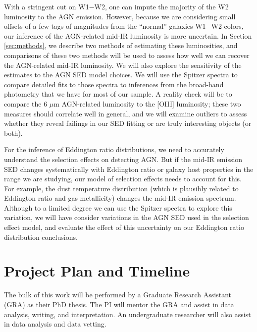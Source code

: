 \documentclass[12pt, preprint]{hacked-aastex}
\begin{document}
With a stringent cut on W1$-$W2, one can impute the majority of 
the W2 luminosity to the AGN emission. However, because we are
considering small offsets of a few tags of magnitudes from the 
``normal'' galaxies W1$-$W2 colors, our inference of the AGN-related
mid-IR luminosity is more uncertain. In Section \ref{sec:methods},
we describe two methods of estimating these luminosities, and comparisons
of these two methods will be used to assess how well we can recover
the AGN-related mid-IR luminosity. We will also explore the 
sensitivity of the estimates to the AGN SED model choices. 
We will use the Spitzer spectra to compare detailed fits to
those spectra to inferences from the broad-band photometry that we 
have for most of our sample. A reality check will be to compare
the 6 $\mu$m AGN-related luminosity to the [OIII] luminosity; these
two measures should correlate well in general, and we will 
examine outliers to assess whether they reveal failings in our
SED fitting or are truly interesting objects (or both).

For the inference of Eddington ratio distributions, we need to 
accurately understand the selection effects on detecting AGN. But 
if the mid-IR emission SED changes systematically with Eddington ratio
or galaxy host properties in the range we are studying, our model
of selection effects needs to account for this. For example, the
dust temperature distribution (which is plausibly related to Eddington 
ratio  and gas metallicity) changes the mid-IR emission spectrum.
Although to a limited degree we can use the Spitzer spectra to 
explore this variation, we will have consider variations in the
AGN SED used in the selection effect model, and evaluate the effect
of this uncertainty on our Eddington ratio distribution conclusions.


\section{Project Plan and Timeline\label{sec:plan}}

The bulk of this work will be performed by a Graduate Research
Assistant (GRA) as their PhD thesis.  The PI will mentor the GRA and 
assist in data analysis, writing, and interpretation. An undergraduate
researcher will also assist in data analysis and data vetting.
\end{document}

